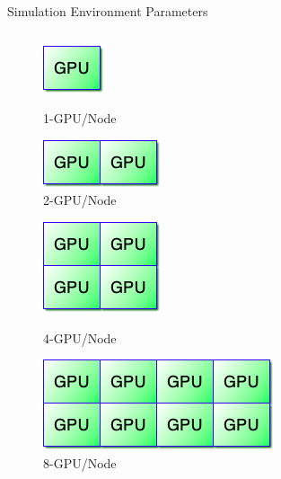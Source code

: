 \documentclass[final]{beamer}
\newlength{\sepwidth}
\newcommand{\separatorcolumn}{\begin{column}{\sepwidth}\end{column}}
\begin{document}
\begin{frame}[t]
\begin{columns}[t]
\begin{column}{0.5\textwidth}
\begin{block}{Simulation Environment Parameters}
\begin{column}{0.3\textwidth}
  \begin{figure}
\centering
\begin{minipage}[t][2cm][t]{.40\textwidth}
\centering
\includegraphics[width=0.25\linewidth]{figs/1gpu.png}
\caption{1-GPU/Node}
\label{fig:13a}
\end{minipage}
\separatorcolumn
\begin{minipage}[t][2cm][t]{.40\textwidth}
\centering
\includegraphics[width=0.5\linewidth]{figs/2gpu.png}
\caption{2-GPU/Node}
\label{fig:13b}
\end{minipage}
\end{figure}
\vspace{2cm}
\begin{figure}
\centering
\begin{minipage}[t][2cm][t]{.40\textwidth}
\centering
\includegraphics[width=0.5\linewidth]{figs/4gpu.png}
\caption{4-GPU/Node}
\label{fig:13a}
\end{minipage}
\separatorcolumn
\begin{minipage}[t][2cm][t]{.40\textwidth}
\centering
\includegraphics[width=1\linewidth]{figs/8gpu.png}
\caption{8-GPU/Node}
\label{fig:13b}
\end{minipage}
\end{figure}


\end{column}
\end{block}
\end{column}
\end{columns}
\end{frame}
\end{document}
